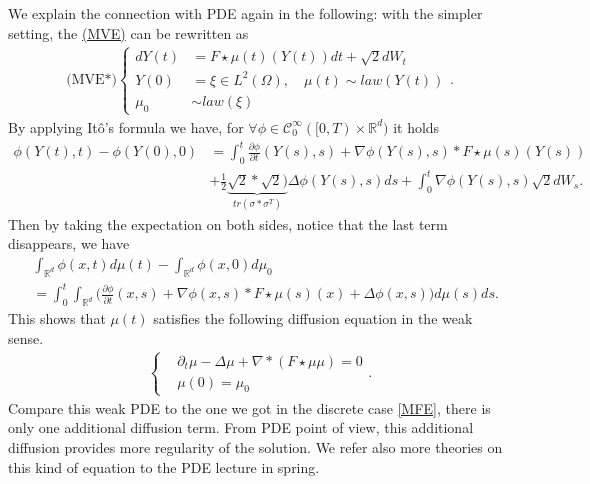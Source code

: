 We explain the connection with PDE again in the following: with the simpler setting, the \hyperref[MVE]{(MVE)} can be rewritten as
 \begin{align}\label{MVE*}
   \text{(MVE*)}\begin{cases}
   d Y(t) &= F\star\mu(t)(Y(t)) dt + \sqrt{2} dW_t\\
    Y(0) &= \xi \in  L^{2}(\Omega ), \quad \mu(t)\sim law (Y(t))\\
    \mu_0 &\sim law(\xi)
   \end{cases}
 .\end{align}
By applying It\^o's formula we have, for $\forall \phi  \in  \mathcal{C}_0^{\infty}([0,T)\times \mathbb{R}^{d} ) $ it holds
\begin{align*}
  \phi(Y(t),t) - \phi(Y(0),0) &= \int_0^{t} \frac{\partial \phi }{\partial t}(Y(s),s) + \nabla \phi(Y(s),s)*F\star\mu(s)(Y(s))  \\
                              &+ \frac{1}{2} \underbrace{\sqrt{2}*\sqrt{2})}_{tr(\sigma *\sigma ^{T} )}\Delta \phi(Y(s),s) ds+ \int_0^{t} \nabla \phi(Y(s),s)  \sqrt{2} dW_s 
.\end{align*}
Then by taking the expectation  on both sides, notice that the last term disappears, we have
\begin{align*}
  &\int_{\mathbb{R}^{d} } \phi(x,t) d\mu(t) - \int_{\mathbb{R}^{d} } \phi(x,0) d\mu_0 \\
  &= \int_0^{t} \int_{\mathbb{R}^{d} } \Big(\frac{\partial \phi }{\partial t}(x,s) + \nabla \phi(x,s)*F\star\mu(s)(x)+ \Delta \phi(x,s) \Big) d\mu(s) ds
.\end{align*}
This shows that $\mu(t)$ satisfies the following diffusion equation in the weak sense.
\begin{align}\label{DiffusionPDE}
  \begin{cases}
    &\partial_t \mu  - \Delta \mu  + \nabla * (F\star\mu  \mu )  =0\\
    &\mu(0) = \mu_0
  \end{cases}
.\end{align}
 Compare this weak PDE to the one we got in the discrete case \autoref{MFE}, there is only one additional diffusion term. From PDE point of view, this additional diffusion provides more regularity of the solution. We refer also more theories on this kind of equation to the PDE lecture in spring.

